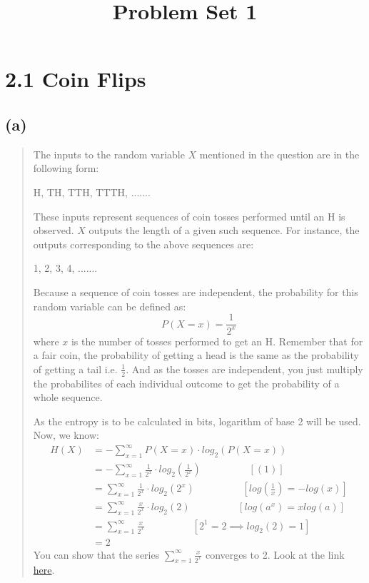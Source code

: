 \documentclass{article}
\title{\vspace{-2cm}Problem Set 1}
\author{}
\date{}
\begin{document}
\maketitle
\section*{2.1 Coin Flips}
\subsection*{(a)} 
\begin{quote} 
	The inputs to the random variable $X$ mentioned in the question are in the following form:

	\begin{center}
		H, TH, TTH, TTTH, .......
	\end{center}

	These inputs represent sequences of coin tosses performed until an H is observed. $X$ outputs the length of a given such sequence. For instance, the outputs corresponding to the above sequences are:
	\begin{center}
		1, 2, 3, 4, .......
	\end{center}
	Because a sequence of coin tosses are independent, the probability for this random variable can be defined as:
	\begin{equation}
		P(X=x) = \frac{1}{2^{x}}
	\end{equation}
	where $x$ is the number of tosses performed to get an H. Remember that for a fair coin, the probability of getting a head is the same as the probability of getting a tail i.e. $\frac{1}{2}$. And as the tosses are independent, you just multiply the probabilites of each individual outcome to get the probability of a whole sequence. 

	As the entropy is to be calculated in bits, logarithm of base 2 will be used. Now, we know:
	\begin{align*}
		H(X) &= - \sum_{x=1}^{\infty}P(X=x)  \cdot log_2(P(X=x)) \\
		     &= - \sum_{x=1}^{\infty}\frac{1}{2^x} \cdot log_2(\frac{1}{2^x})\hspace{2cm}[(1)] \\
		     &= \sum_{x=1}^{\infty}\frac{1}{2^x} \cdot log_2(2^x)\hspace{2cm}[log(\frac{1}{x}) = -log(x)] \\
		     &= \sum_{x=1}^{\infty}\frac{x}{2^x} \cdot log_2(2)\hspace{2cm}[log(a^x) = xlog(a)] \\
		     &= \sum_{x=1}^{\infty}\frac{x}{2^x}\hspace{2cm}[2^1 = 2 \implies log_2(2) = 1] \\
		     &= 2\hspace{2cm} 
	\end{align*}
	You can show that the series $\sum_{x=1}^{\infty}\frac{x}{2^x}$ converges to 2. Look at the link \href{https://math.stackexchange.com/questions/1102135/sum-sum-x-0-infty-fracx2x}{here}.
\end{quote}
\end{document}
